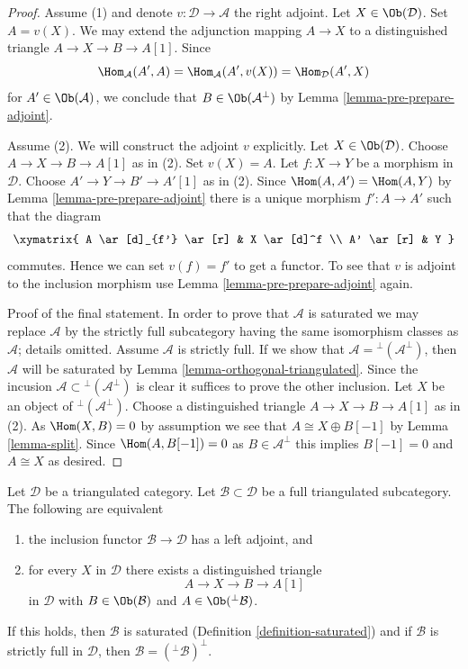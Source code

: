 \begin{proof}
Assume (1) and denote $v : \mathcal{D} \to \mathcal{A}$ the right adjoint.
Let $X \in \Ob(\mathcal{D})$. Set $A = v(X)$. We may extend the
adjunction mapping $A \to X$ to a distinguished triangle
$A \to X \to B \to A[1]$. Since
$$
\Hom_\mathcal{A}(A', A) =
\Hom_\mathcal{A}(A', v(X)) =
\Hom_\mathcal{D}(A', X)
$$
for $A' \in \Ob(\mathcal{A})$, we conclude that $B \in \Ob(\mathcal{A}^\perp)$
by Lemma \ref{lemma-pre-prepare-adjoint}.

\medskip\noindent
Assume (2). We will construct the adjoint $v$ explicitly.
Let $X \in \Ob(\mathcal{D})$. Choose $A \to X \to B \to A[1]$ as in (2).
Set $v(X) = A$. Let $f : X \to Y$ be a morphism in $\mathcal{D}$.
Choose $A' \to Y \to B' \to A'[1]$ as in (2). Since
$\Hom(A, A') = \Hom(A, Y)$ by Lemma \ref{lemma-pre-prepare-adjoint}
there is a unique morphism $f' : A \to A'$ such that the diagram
$$
\xymatrix{
A \ar[d]_{f'} \ar[r] & X \ar[d]^f \\
A' \ar[r] & Y
}
$$
commutes. Hence we can set $v(f) = f'$ to get a functor.
To see that $v$ is adjoint to the inclusion morphism use
Lemma \ref{lemma-pre-prepare-adjoint} again.

\medskip\noindent
Proof of the final statement. In order to prove that $\mathcal{A}$
is saturated we may replace $\mathcal{A}$ by the strictly full
subcategory having the same isomorphism classes as $\mathcal{A}$;
details omitted. Assume $\mathcal{A}$ is strictly full. If we show that
$\mathcal{A} = {}^\perp(\mathcal{A}^\perp)$, then
$\mathcal{A}$ will be saturated by Lemma \ref{lemma-orthogonal-triangulated}.
Since the incusion $\mathcal{A} \subset {}^\perp(\mathcal{A}^\perp)$
is clear it suffices to prove the other inclusion.
Let $X$ be an object of ${}^\perp(\mathcal{A}^\perp)$.
Choose a distinguished triangle $A \to X \to B \to A[1]$
as in (2). As $\Hom(X, B) = 0$ by assumption we see that
$A \cong X \oplus B[-1]$ by Lemma \ref{lemma-split}.
Since $\Hom(A, B[-1]) = 0$ as $B \in \mathcal{A}^\perp$
this implies $B[-1] = 0$ and $A \cong X$ as desired.
\end{proof}

\begin{lemma}
\label{lemma-left-adjoint}
Let $\mathcal{D}$ be a triangulated category. Let
$\mathcal{B} \subset \mathcal{D}$ be a full triangulated subcategory.
The following are equivalent
\begin{enumerate}
\item the inclusion functor $\mathcal{B} \to \mathcal{D}$
has a left adjoint, and
\item for every $X$ in $\mathcal{D}$ there exists a distinguished
triangle
$$
A \to X \to B \to A[1]
$$
in $\mathcal{D}$ with $B \in \Ob(\mathcal{B})$ and
$A \in \Ob({}^\perp\mathcal{B})$.
\end{enumerate}
If this holds, then $\mathcal{B}$ is saturated
(Definition \ref{definition-saturated}) and if $\mathcal{B}$
is strictly full in $\mathcal{D}$, then
$\mathcal{B} = ({}^\perp\mathcal{B})^\perp$.
\end{lemma}

